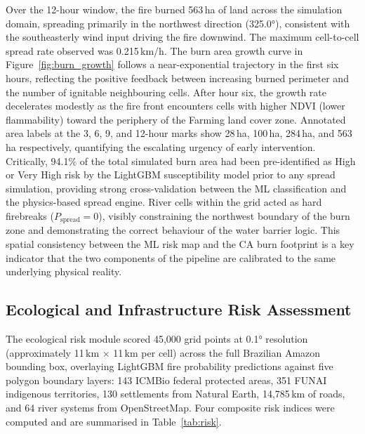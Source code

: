 \documentclass[12pt,a4paper]{article}
\begin{document}
Over the 12-hour window, the fire burned 563\,ha of land across the simulation domain, spreading primarily in the northwest direction (325.0°), consistent with the southeasterly wind input driving the fire downwind. The maximum cell-to-cell spread rate observed was 0.215\,km/h. The burn area growth curve in Figure~\ref{fig:burn_growth} follows a near-exponential trajectory in the first six hours, reflecting the positive feedback between increasing burned perimeter and the number of ignitable neighbouring cells. After hour six, the growth rate decelerates modestly as the fire front encounters cells with higher NDVI (lower flammability) toward the periphery of the Farming land cover zone. Annotated area labels at the 3, 6, 9, and 12-hour marks show 28\,ha, 100\,ha, 284\,ha, and 563\,ha respectively, quantifying the escalating urgency of early intervention. Critically, 94.1\% of the total simulated burn area had been pre-identified as High or Very High risk by the LightGBM susceptibility model prior to any spread simulation, providing strong cross-validation between the ML classification and the physics-based spread engine. River cells within the grid acted as hard firebreaks ($P_{\text{spread}} = 0$), visibly constraining the northwest boundary of the burn zone and demonstrating the correct behaviour of the water barrier logic. This spatial consistency between the ML risk map and the CA burn footprint is a key indicator that the two components of the pipeline are calibrated to the same underlying physical reality.

\subsection{Ecological and Infrastructure Risk Assessment}

The ecological risk module scored 45,000 grid points at 0.1° resolution (approximately 11\,km $\times$ 11\,km per cell) across the full Brazilian Amazon bounding box, overlaying LightGBM fire probability predictions against five polygon boundary layers: 143 ICMBio federal protected areas, 351 FUNAI indigenous territories, 130 settlements from Natural Earth, 14,785\,km of roads, and 64 river systems from OpenStreetMap. Four composite risk indices were computed and are summarised in Table~\ref{tab:risk}.
\end{document}
